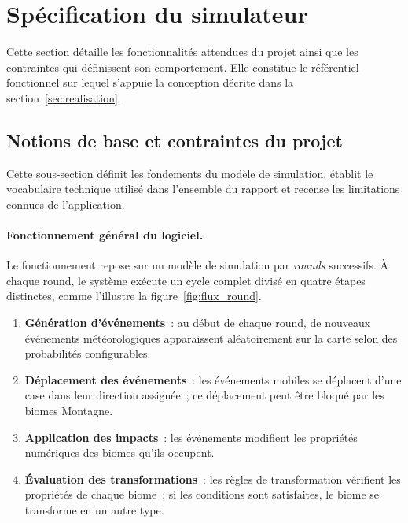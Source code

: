 \section{Spécification du simulateur}
\label{sec:specification}

Cette section détaille les fonctionnalités attendues du projet ainsi que les
contraintes qui définissent son comportement. Elle constitue le référentiel
fonctionnel sur lequel s'appuie la conception décrite dans la
section~\ref{sec:realisation}.

\subsection{Notions de base et contraintes du projet}
\label{subsec:notions_base}

Cette sous-section définit les fondements du modèle de simulation, établit le
vocabulaire technique utilisé dans l'ensemble du rapport et recense les
limitations connues de l'application.

\paragraph{Fonctionnement général du logiciel.}
Le fonctionnement repose sur un modèle de simulation par \emph{rounds} successifs.
À chaque round, le système exécute un cycle complet divisé en quatre étapes
distinctes, comme l'illustre la figure~\ref{fig:flux_round}.

\begin{enumerate}
  \item \textbf{Génération d'événements}~: au début de chaque round, de nouveaux
    événements météorologiques apparaissent aléatoirement sur la carte selon des
    probabilités configurables.
  \item \textbf{Déplacement des événements}~: les événements mobiles se déplacent
    d'une case dans leur direction assignée~; ce déplacement peut être bloqué par
    les biomes Montagne.
  \item \textbf{Application des impacts}~: les événements modifient les propriétés
    numériques des biomes qu'ils occupent.
  \item \textbf{Évaluation des transformations}~: les règles de transformation
    vérifient les propriétés de chaque biome~; si les conditions sont satisfaites,
    le biome se transforme en un autre type.
\end{enumerate}

